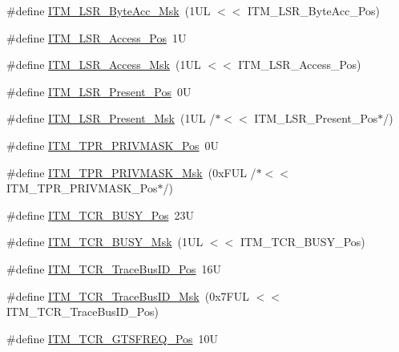 \begin{DoxyCompactItemize}
\#define \hyperlink{group___c_m_s_i_s___i_t_m_ga91f492b2891bb8b7eac5b58de7b220f4}{I\-T\-M\-\_\-\-L\-S\-R\-\_\-\-Byte\-Acc\-\_\-\-Msk}~(1\-U\-L $<$$<$ I\-T\-M\-\_\-\-L\-S\-R\-\_\-\-Byte\-Acc\-\_\-\-Pos)
\item 
\#define \hyperlink{group___c_m_s_i_s___i_t_m_ga144a49e12b83ad9809fdd2769094fdc0}{I\-T\-M\-\_\-\-L\-S\-R\-\_\-\-Access\-\_\-\-Pos}~1\-U
\item 
\#define \hyperlink{group___c_m_s_i_s___i_t_m_gac8ae69f11c0311da226c0c8ec40b3d37}{I\-T\-M\-\_\-\-L\-S\-R\-\_\-\-Access\-\_\-\-Msk}~(1\-U\-L $<$$<$ I\-T\-M\-\_\-\-L\-S\-R\-\_\-\-Access\-\_\-\-Pos)
\item 
\#define \hyperlink{group___c_m_s_i_s___i_t_m_gaf5740689cf14564d3f3fd91299b6c88d}{I\-T\-M\-\_\-\-L\-S\-R\-\_\-\-Present\-\_\-\-Pos}~0\-U
\item 
\#define \hyperlink{group___c_m_s_i_s___i_t_m_gaa5bc2a7f5f1d69ff819531f5508bb017}{I\-T\-M\-\_\-\-L\-S\-R\-\_\-\-Present\-\_\-\-Msk}~(1\-U\-L /$\ast$$<$$<$ I\-T\-M\-\_\-\-L\-S\-R\-\_\-\-Present\-\_\-\-Pos$\ast$/)
\item 
\#define \hyperlink{group___c_m_s_i_s___i_t_m_ga7abe5e590d1611599df87a1884a352e8}{I\-T\-M\-\_\-\-T\-P\-R\-\_\-\-P\-R\-I\-V\-M\-A\-S\-K\-\_\-\-Pos}~0\-U
\item 
\#define \hyperlink{group___c_m_s_i_s___i_t_m_ga168e089d882df325a387aab3a802a46b}{I\-T\-M\-\_\-\-T\-P\-R\-\_\-\-P\-R\-I\-V\-M\-A\-S\-K\-\_\-\-Msk}~(0x\-F\-U\-L /$\ast$$<$$<$ I\-T\-M\-\_\-\-T\-P\-R\-\_\-\-P\-R\-I\-V\-M\-A\-S\-K\-\_\-\-Pos$\ast$/)
\item 
\#define \hyperlink{group___c_m_s_i_s___i_t_m_ga9174ad4a36052c377cef4e6aba2ed484}{I\-T\-M\-\_\-\-T\-C\-R\-\_\-\-B\-U\-S\-Y\-\_\-\-Pos}~23\-U
\item 
\#define \hyperlink{group___c_m_s_i_s___i_t_m_ga43ad7cf33de12f2ef3a412d4f354c60f}{I\-T\-M\-\_\-\-T\-C\-R\-\_\-\-B\-U\-S\-Y\-\_\-\-Msk}~(1\-U\-L $<$$<$ I\-T\-M\-\_\-\-T\-C\-R\-\_\-\-B\-U\-S\-Y\-\_\-\-Pos)
\item 
\#define \hyperlink{group___c_m_s_i_s___i_t_m_gaca0281de867f33114aac0636f7ce65d3}{I\-T\-M\-\_\-\-T\-C\-R\-\_\-\-Trace\-Bus\-I\-D\-\_\-\-Pos}~16\-U
\item 
\#define \hyperlink{group___c_m_s_i_s___i_t_m_ga60c20bd9649d1da5a2be8e656ba19a60}{I\-T\-M\-\_\-\-T\-C\-R\-\_\-\-Trace\-Bus\-I\-D\-\_\-\-Msk}~(0x7\-F\-U\-L $<$$<$ I\-T\-M\-\_\-\-T\-C\-R\-\_\-\-Trace\-Bus\-I\-D\-\_\-\-Pos)
\item 
\#define \hyperlink{group___c_m_s_i_s___i_t_m_ga96c7c7cbc0d98426c408090b41f583f1}{I\-T\-M\-\_\-\-T\-C\-R\-\_\-\-G\-T\-S\-F\-R\-E\-Q\-\_\-\-Pos}~10\-U

\end{DoxyCompactItemize}
